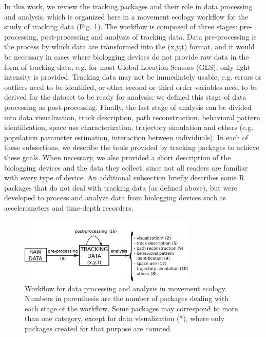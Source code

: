 \documentclass[a4paper,12pt]{article}
\begin{document}
	In this work, we review the tracking packages and their role in data processing and analysis, which is organized here in a movement ecology workflow for the study of tracking data (Fig. \ref{fig:DataProcess}). The workflow is composed of three stages: pre-processing, post-processing and analysis of tracking data. Data pre-processing is the process by which data are transformed into the (x,y,t) format, and it would be necessary in cases where biologging devices do not provide raw data in the form of tracking data, e.g. for most Global Location Sensors (GLS), only light intensity is provided. Tracking data may not be immediately usable, e.g. errors or outliers need to be identified, or other second or third order variables need to be derived for the dataset to be ready for analysis; we defined this stage of data processing as post-processing. Finally, the last stage of analysis can be divided into data visualization, track description, path reconstruction, behavioral pattern identification, space use characterization, trajectory simulation and others (e.g. population parameter estimation, interaction between individuals). In each of these subsections, we describe the tools provided by tracking packages to achieve these goals. When necessary, we also provided a short description of the biologging devices and the data they collect, since not all readers are familiar with every type of device. An additional subsection briefly describes some R packages that do not deal with tracking data (as defined above), but were developed to process and analyze data from biologging devices such as accelerometers and time-depth recorders. 
	
	\begin{figure}
		\centering
		\includegraphics[width=0.75\textwidth]{./mes_images/process-sketch-4.pdf}
		\caption{\label{fig:DataProcess} Workflow for data processing and analysis in movement ecology. Numbers in parenthesis are the number of packages dealing with each stage of the workflow. Some packages may correspond to more than one category, except for data visualization (*), where only packages created for that purpose are counted.}
	\end{figure} 
	
\end{document}
